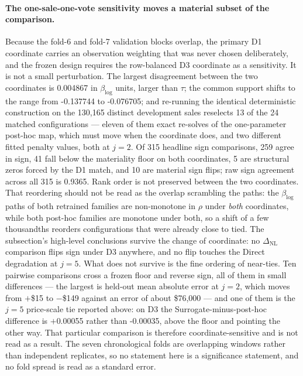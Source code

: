 \documentclass[10pt]{article}
\theoremstyle{definition}
\newcommand{\1}{\mathbf{1}}
\begin{document}
\paragraph{The one-sale-one-vote sensitivity moves a material subset of the
comparison.}
Because the fold-6 and fold-7 validation blocks overlap, the primary D1 coordinate
carries an observation weighting that was never chosen deliberately, and the frozen design requires
the row-balanced D3 coordinate as a sensitivity. It is not a small perturbation. The largest
disagreement between the two coordinates is 0.004867 in $\beta_{\log}$ units, larger than
$\tau$; the common support shifts to the range from -0.137744 to -0.076705; and re-running the
identical deterministic construction on the 130,165 distinct development sales reselects
13 of the 24 matched configurations --- eleven of them exact re-solves of the one-parameter
post-hoc map, which must move when the coordinate does, and two different fitted penalty values,
both at $j=2$. Of 315 headline sign comparisons, 259 agree in sign, 41 fall below the materiality
floor on both coordinates, 5 are structural zeros forced by the D1 match, and 10 are material sign
flips; raw sign agreement across all 315 is 0.9365. Rank order is not
preserved between the two coordinates. That reordering should not be read as the overlap scrambling
the paths: the $\beta_{\log}$ paths of both retrained families are non-monotone in $\rho$ under
\emph{both} coordinates, while both post-hoc families are monotone under both, so a shift of a few
thousandths reorders configurations that were already close to tied. The subsection's high-level
conclusions survive the change of coordinate: no $\Delta_{\mathrm{NL}}$ comparison flips sign under
D3 anywhere, and no flip touches the Direct degradation at $j=5$. What does not survive is the fine
ordering of near-ties. Ten pairwise comparisons cross a frozen floor and reverse sign, all of them
in small differences --- the largest is held-out mean absolute error at $j=2$, which moves from
$+$\$15 to $-$\$149 against an error of about \$76,000 --- and one of them is the $j=5$
price-scale tie reported above: on D3 the Surrogate-minus-post-hoc difference is $+$0.00055 rather
than -0.00035, above the floor and pointing the other way. That particular comparison is therefore
coordinate-sensitive and is not read as a result. The seven chronological folds are overlapping
windows rather than independent
replicates, so no statement here is a significance statement, and no fold spread is read as a
standard error.
\end{document}
